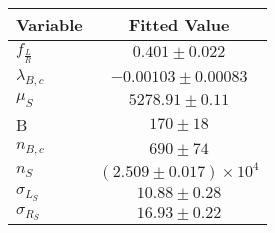 \begin{tabular}[t]{lc}
\hline
Variable &Fitted Value\\
\hline\hline
$f_{\frac{L}{R}}$&$0.401\pm0.022$\\
\hline
$\lambda_{B,c}$&$-0.00103\pm0.00083$\\
\hline
$\mu_S$&$5278.91\pm0.11$\\
\hline
B&$170\pm18$\\
\hline
$n_{B,c}$&$690\pm74$\\
\hline
$n_S$&$(2.509\pm0.017)\times 10^4$\\
\hline
$\sigma_{L_S}$&$10.88\pm0.28$\\
\hline
$\sigma_{R_S}$&$16.93\pm0.22$\\
\hline
\end{tabular}